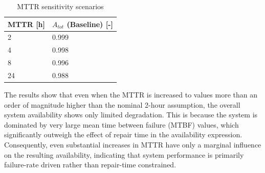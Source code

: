 \begin{table}[H]
    \centering
    \caption{MTTR sensitivity scenarios}
    \label{tab:MTTR_scenarios}
    \begin{tabular}{|p{2.5cm}|p{3.5cm}|}
        \hline
        \textbf{MTTR [h]} & \textbf{$A_{tot}$ (Baseline) [-]} \\
        \hline\hline
        2  & 0.999 \\
        \hline
        4  & 0.998 \\
        \hline
        8  & 0.996 \\
        \hline
        24 & 0.988 \\
        \hline
    \end{tabular}
\end{table}

The results show that even when the MTTR is increased to values more than an order of magnitude higher than the nominal 2-hour assumption, the overall system availability shows only limited degradation. This is because the system is dominated by very large mean time between failure (MTBF) values, which significantly outweigh the effect of repair time in the availability expression. Consequently, even substantial increases in MTTR have only a marginal influence on the resulting availability, indicating that system performance is primarily failure-rate driven rather than repair-time constrained. 



